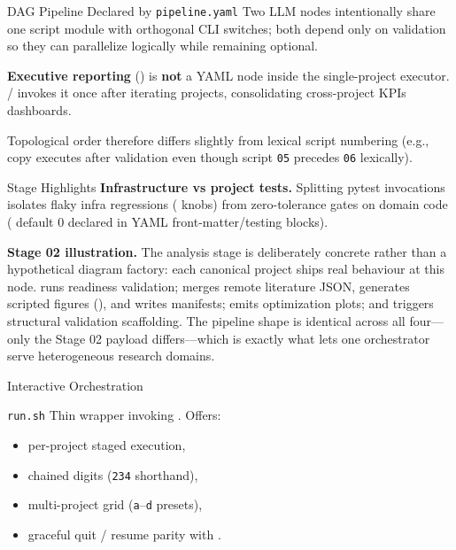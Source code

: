 \documentclass[
  ignorenonframetext,
]{beamer}
\providecommand{\tightlist}{%
  \setlength{\itemsep}{0pt}\setlength{\parskip}{0pt}}
\begin{document}
\begin{frame}{DAG Pipeline Declared by
\texttt{pipeline.yaml}}
Two LLM nodes intentionally share one script module with orthogonal CLI
switches; both depend only on validation so they can parallelize
logically while remaining optional.

\textbf{Executive reporting}
() is
\textbf{not} a YAML node inside the single-project executor.
 /  invokes
it once after iterating projects, consolidating cross-project KPIs
dashboards.

Topological order therefore differs slightly from lexical script
numbering (e.g., copy executes after validation even though script
\texttt{05} precedes \texttt{06} lexically).

\begin{block}{Stage Highlights}
\protect{}\label{stage-highlights}
\textbf{Infrastructure vs project tests.} Splitting pytest invocations
isolates flaky infra regressions ( knobs)
from zero-tolerance gates on domain code
( default 0 declared in YAML
front-matter/testing blocks).

\textbf{Stage 02 illustration.} The analysis stage is deliberately
concrete rather than a hypothetical diagram factory: each canonical
project ships real behaviour at this node.
 runs readiness validation;
 merges remote literature JSON,
generates scripted figures (),
and writes manifests;  emits
optimization plots; and  triggers
structural validation scaffolding. The pipeline shape is identical
across all four---only the Stage 02 payload differs---which is exactly
what lets one orchestrator serve heterogeneous research domains.
\end{block}

\begin{block}{Interactive Orchestration}
\protect{}\label{interactive-orchestration}
\begin{block}{\texttt{run.sh}}
\protect{}\label{run.sh}
Thin wrapper invoking .
Offers:

\begin{itemize}
\tightlist
\item
  per-project staged execution,
\item
  chained digits (\texttt{234} shorthand),
\item
  multi-project grid (\texttt{a}--\texttt{d} presets),
\item
  graceful quit / resume parity with .
\end{itemize}


\end{block}
\end{block}
\end{frame}
\end{document}
